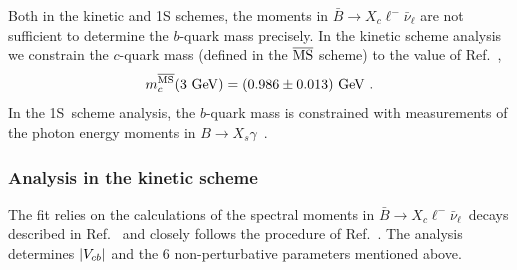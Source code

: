 Both in the kinetic and 1S schemes, the moments in $\bar B\to
X_c\ell^-\bar\nu_\ell$ are not sufficient to determine the $b$-quark
mass precisely. In the kinetic scheme analysis we constrain the $c$-quark
mass (defined in the $\overline{\rm MS}$ scheme) to the value of
Ref.~\cite{Chetyrkin:2009fv},
\begin{equation}
  m_c^{\overline{\rm MS}}(3~{\rm GeV})=(0.986\pm 0.013)~{\rm GeV}~.
\end{equation}
In the 1S~scheme analysis, the $b$-quark mass is constrained with
measurements of the photon energy moments in $B\to
X_s\gamma$~\cite{Aubert:2005cua,Aubert:2006gg,Limosani:2009qg,Chen:2001fja}.

\subsubsection{Analysis in the kinetic scheme}
\label{globalfitsKinetic}

The fit relies on the calculations of the spectral moments in $\bar
B\to X_c\ell^-\bar\nu_\ell$~decays described in
Ref.~\cite{Gambino:2011cq} and closely follows the procedure of
Ref.~\cite{Gambino:2013rza}. The analysis determines $|V_{cb}|$ and the 6
non-perturbative parameters mentioned above.

